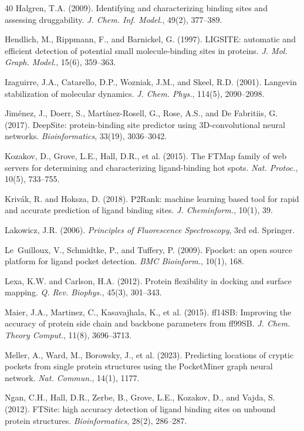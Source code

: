 \documentclass{sn-jnl}
\begin{document}
\begin{thebibliography}{40}
Halgren, T.A. (2009).
Identifying and characterizing binding sites and assessing druggability.
\textit{J. Chem. Inf. Model.}, 49(2), 377--389.

Hendlich, M., Rippmann, F., and Barnickel, G. (1997).
LIGSITE: automatic and efficient detection of potential small molecule-binding sites in proteins.
\textit{J. Mol. Graph. Model.}, 15(6), 359--363.

Izaguirre, J.A., Catarello, D.P., Wozniak, J.M., and Skeel, R.D. (2001).
Langevin stabilization of molecular dynamics.
\textit{J. Chem. Phys.}, 114(5), 2090--2098.

Jim\'enez, J., Doerr, S., Mart\'inez-Rosell, G., Rose, A.S., and De Fabritiis, G. (2017).
DeepSite: protein-binding site predictor using 3D-convolutional neural networks.
\textit{Bioinformatics}, 33(19), 3036--3042.

Kozakov, D., Grove, L.E., Hall, D.R., et al. (2015).
The FTMap family of web servers for determining and characterizing ligand-binding hot spots.
\textit{Nat. Protoc.}, 10(5), 733--755.

Kriv\'ak, R. and Hoksza, D. (2018).
P2Rank: machine learning based tool for rapid and accurate prediction of ligand binding sites.
\textit{J. Cheminform.}, 10(1), 39.

Lakowicz, J.R. (2006).
\textit{Principles of Fluorescence Spectroscopy}, 3rd ed. Springer.

Le~Guilloux, V., Schmidtke, P., and Tuffery, P. (2009).
Fpocket: an open source platform for ligand pocket detection.
\textit{BMC Bioinform.}, 10(1), 168.

Lexa, K.W. and Carlson, H.A. (2012).
Protein flexibility in docking and surface mapping.
\textit{Q. Rev. Biophys.}, 45(3), 301--343.

Maier, J.A., Martinez, C., Kasavajhala, K., et al. (2015).
ff14SB: Improving the accuracy of protein side chain and backbone parameters from ff99SB.
\textit{J. Chem. Theory Comput.}, 11(8), 3696--3713.

Meller, A., Ward, M., Borowsky, J., et al. (2023).
Predicting locations of cryptic pockets from single protein structures using the PocketMiner graph neural network.
\textit{Nat. Commun.}, 14(1), 1177.

Ngan, C.H., Hall, D.R., Zerbe, B., Grove, L.E., Kozakov, D., and Vajda, S. (2012).
FTSite: high accuracy detection of ligand binding sites on unbound protein structures.
\textit{Bioinformatics}, 28(2), 286--287.


\end{thebibliography}
\end{document}
